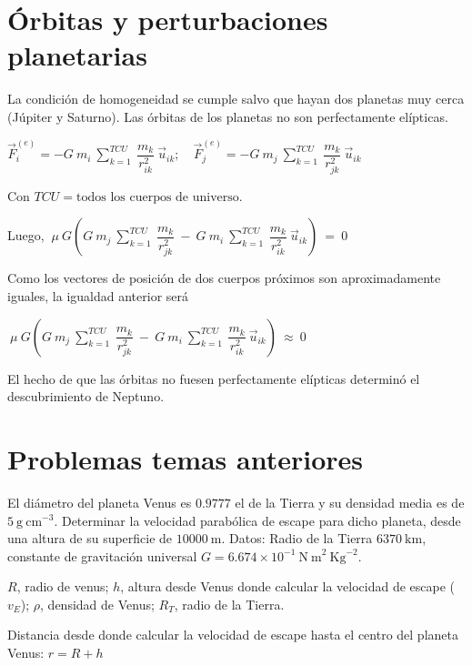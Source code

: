 \section{Órbitas y perturbaciones planetarias}
 
 La condición de homogeneidad se cumple salvo que hayan dos planetas muy cerca (Júpiter y Saturno). Las órbitas de los planetas no son perfectamente elípticas.
 
 $\displaystyle \vec  F_i^{(e)} = -G \ m_i \  \sum_{k=1}^{TCU} \  \dfrac{m_k}{r^2_{ik}} \ \vec u_{ik} ; \quad 
 \vec  F_j^{(e)} = -G \ m_j \  \sum_{k=1}^{TCU} \  \dfrac{m_k}{r^2_{jk}} \ \vec u_{ik}$
 
 Con $TCU=\text{todos los cuerpos de universo}.$
 
 Luego, $\ \displaystyle \mu \ G \left( G \ m_j \  \sum_{k=1}^{TCU} \  \dfrac{m_k}{r^2_{jk}} \ - \ G \ m_i \  \sum_{k=1}^{TCU} \  \dfrac{m_k}{r^2_{ik}} \ \vec u_{ik} \right)\ = \ 0  $
 
 Como los vectores de posición de dos cuerpos próximos son aproximadamente iguales, la igualdad anterior será 
 
  $\ \displaystyle \mu \ G \left( G \ m_j \  \sum_{k=1}^{TCU} \  \dfrac{m_k}{r^2_{jk}} \ - \ G \ m_i \  \sum_{k=1}^{TCU} \  \dfrac{m_k}{r^2_{ik}} \ \vec u_{ik} \right)\ \approx \ 0  $
  
  El hecho de que las órbitas no fuesen perfectamente elípticas determinó el descubrimiento de Neptuno.
  
\section{Problemas temas anteriores}

\begin{prob}
El diámetro del planeta Venus es $0.9777$ el de la Tierra y su densidad media es de $5\ \mathrm{g\ cm}^{-3}$. Determinar la velocidad parabólica de escape para dicho planeta, desde una altura de su superficie de $10000\ \textrm{m}$. Datos: Radio de la Tierra $6370\ \mathrm{km}$, constante de gravitación universal $G=6.674\times 10^{-1} \ \mathrm{N\ m}^2 \ \mathrm{Kg}^{-2}$.
\end{prob}

$R$, radio de venus; $h$, altura desde Venus donde calcular la velocidad de escape ($v_E$); $\rho$, densidad de Venus; $R_T$, radio de la Tierra.

Distancia desde donde calcular la velocidad de escape hasta el centro del planeta Venus: $r=R+h$

